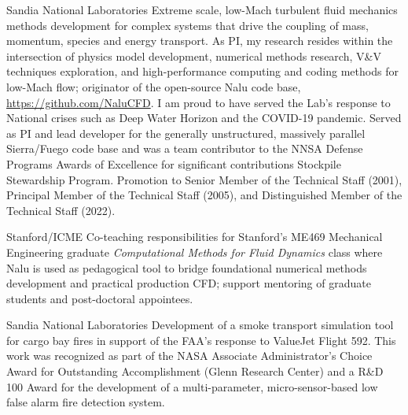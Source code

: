 \documentclass[letterpaper]{twentysecondcv_spd} %
\begin{document}
\begin{twenty}

	 {Sandia National Laboratories} {Extreme scale, low-Mach turbulent fluid mechanics methods development for complex systems that drive the coupling of mass, momentum, species and energy transport. As PI, my research resides within the intersection of physics model development, numerical methods research, V\&V techniques exploration, and high-performance computing and coding methods for low-Mach flow; originator of the open-source Nalu code base, \underline{https://github.com/NaluCFD}. I am proud to have served the Lab's response to National crises such as Deep Water Horizon and the COVID-19 pandemic. Served as PI and lead developer for the generally unstructured, massively parallel Sierra/Fuego code base and was a team contributor to the NNSA Defense Programs Awards of Excellence for significant contributions Stockpile Stewardship Program. Promotion to Senior Member of the Technical Staff (2001), Principal Member of the Technical Staff (2005), and Distinguished Member of the Technical Staff (2022).}
	
	 {Stanford/ICME} {Co-teaching responsibilities for Stanford's ME469 Mechanical Engineering graduate  \textit{Computational Methods for Fluid Dynamics} class where Nalu is used as pedagogical tool to bridge foundational numerical methods development and practical production CFD; support mentoring of graduate students and post-doctoral appointees.}
	
	 {Sandia National Laboratories}  {Development of a smoke transport simulation tool for cargo bay fires in support of the FAA's response to ValueJet Flight 592. This work was recognized as part of the NASA Associate Administrator's Choice Award for Outstanding Accomplishment (Glenn Research Center) and a R\&D 100 Award for the development of a multi-parameter, micro-sensor-based low false alarm fire detection system.}
  
\end{twenty}


\newpage %

\end{document}
